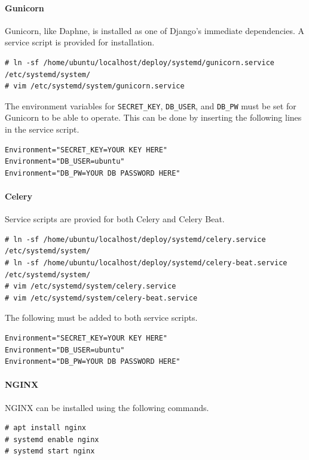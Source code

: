 \paragraph{Gunicorn}

Gunicorn, like Daphne, is installed as one of Django's immediate dependencies.
A service script is provided for installation.
\begin{lstlisting}
# ln -sf /home/ubuntu/localhost/deploy/systemd/gunicorn.service /etc/systemd/system/
# vim /etc/systemd/system/gunicorn.service
\end{lstlisting}
The environment variables for \lstinline{SECRET_KEY}, \lstinline{DB_USER},
and \lstinline{DB_PW} must be set for Gunicorn to be able to operate.
This can be done by inserting the following lines in the service script.
\begin{lstlisting}
Environment="SECRET_KEY=YOUR KEY HERE"
Environment="DB_USER=ubuntu"
Environment="DB_PW=YOUR DB PASSWORD HERE"
\end{lstlisting}

\paragraph{Celery}

Service scripts are provied for both Celery and Celery Beat.

\begin{lstlisting}
# ln -sf /home/ubuntu/localhost/deploy/systemd/celery.service /etc/systemd/system/
# ln -sf /home/ubuntu/localhost/deploy/systemd/celery-beat.service /etc/systemd/system/
# vim /etc/systemd/system/celery.service
# vim /etc/systemd/system/celery-beat.service
\end{lstlisting}
The following must be added to both service scripts.
\begin{lstlisting}
Environment="SECRET_KEY=YOUR KEY HERE"
Environment="DB_USER=ubuntu"
Environment="DB_PW=YOUR DB PASSWORD HERE"
\end{lstlisting}


\paragraph{NGINX}

NGINX can be installed using the following commands.
\begin{lstlisting}
# apt install nginx
# systemd enable nginx
# systemd start nginx
\end{lstlisting}


